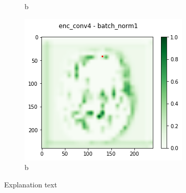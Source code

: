 \begin{figure}[H]
\begin{subfigure}{.33\textwidth}
        \caption{b}
    \end{subfigure}
        \begin{subfigure}{.33\textwidth}
        \centering
        \includegraphics[width=\linewidth]{chapters/04_segmentation/images/grad_cam_14.png}
        \caption{b}
    \end{subfigure}
    \caption{Explanation text}
\end{figure}

